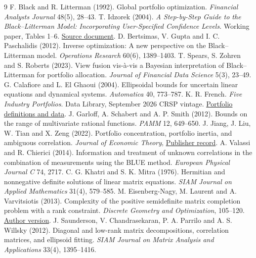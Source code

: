 \documentclass[11pt]{article}
\begin{document}
\small\enlargethispage{2\baselineskip}\begin{thebibliography}{9}
 F. Black and R. Litterman (1992). Global portfolio optimization. \emph{Financial Analysts Journal} 48(5), 28--43.
 T. Idzorek (2004). \emph{A Step-by-Step Guide to the Black--Litterman Model: Incorporating User-Specified Confidence Levels}. Working paper, Tables 1--6. \href{https://people.duke.edu/~charvey/Teaching/BA453_2005/Idzorek_onBL.pdf}{Source document}.
 D. Bertsimas, V. Gupta and I. C. Paschalidis (2012). Inverse optimization: A new perspective on the Black--Litterman model. \emph{Operations Research} 60(6), 1389--1403.
 T. Spears, S. Zohren and S. Roberts (2023). View fusion vis-à-vis a Bayesian interpretation of Black--Litterman for portfolio allocation. \emph{Journal of Financial Data Science} 5(3), 23--49.
 G. Calafiore and L. El Ghaoui (2004). Ellipsoidal bounds for uncertain linear equations and dynamical systems. \emph{Automatica} 40, 773--787.
 K. R. French. \emph{Five Industry Portfolios}. Data Library, September 2026 CRSP vintage. \href{https://mba.tuck.dartmouth.edu/pages/faculty/ken.french/data_library/det_5_ind_port.html}{Portfolio definitions and data}.
 J. Garloff, A. Schabert and A. P. Smith (2012). Bounds on the range of multivariate rational functions. \emph{PAMM} 12, 649--650.
 J. Jiang, J. Liu, W. Tian and X. Zeng (2022). Portfolio concentration, portfolio inertia, and ambiguous correlation. \emph{Journal of Economic Theory}, \href{https://www.sciencedirect.com/science/article/abs/pii/S0022053122000539}{Publisher record}.
 A. Valassi and R. Chierici (2014). Information and treatment of unknown correlations in the combination of measurements using the BLUE method. \emph{European Physical Journal C} 74, 2717.
 C. G. Khatri and S. K. Mitra (1976). Hermitian and nonnegative definite solutions of linear matrix equations. \emph{SIAM Journal on Applied Mathematics} 31(4), 579--585.
 M. Eisenberg-Nagy, M. Laurent and A. Varvitsiotis (2013). Complexity of the positive semidefinite matrix completion problem with a rank constraint. \emph{Discrete Geometry and Optimization}, 105--120. \href{https://arxiv.org/abs/1203.6602}{Author version}.
 J. Saunderson, V. Chandrasekaran, P. A. Parrilo and A. S. Willsky (2012). Diagonal and low-rank matrix decompositions, correlation matrices, and ellipsoid fitting. \emph{SIAM Journal on Matrix Analysis and Applications} 33(4), 1395--1416.
\end{thebibliography}
\end{document}
